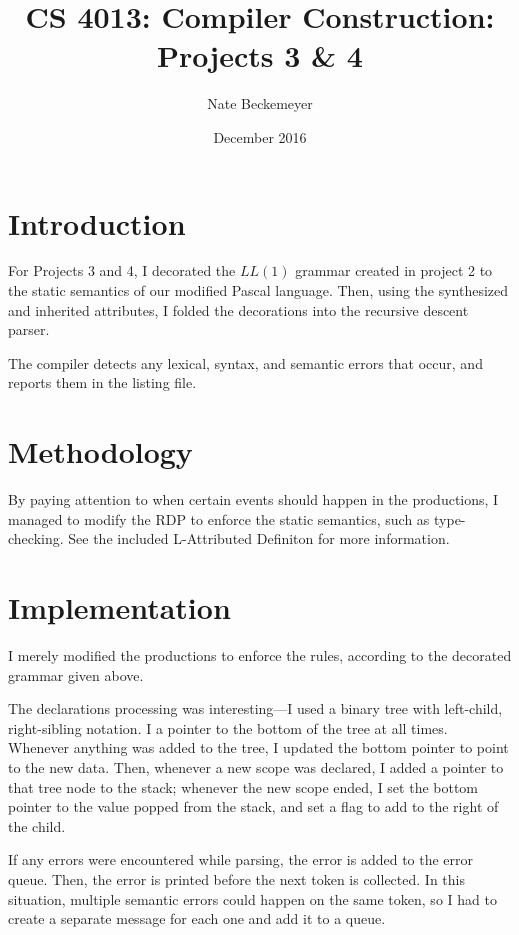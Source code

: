 \documentclass[titlepage]{article}
\author{Nate Beckemeyer}
\title{\textbf{CS 4013: Compiler Construction: Projects 3 \& 4}}
\date{December 2016}
\begin{document}
    \maketitle
    \section*{Introduction}
    For Projects 3 and 4, I decorated the $LL(1)$ grammar created in project
    2 to the static semantics of our modified Pascal language. Then,
    using the synthesized and inherited attributes, I folded the decorations
    into the recursive descent parser.

    The compiler detects any lexical, syntax, and semantic errors that occur,
    and reports them in the listing file.

    \section{Methodology}
    By paying attention to when certain events should happen in the productions,
    I managed to modify the RDP to enforce the static semantics, such as
    type-checking. See the included L-Attributed Definiton for more information.

    

    \section{Implementation}
    I merely modified the productions to enforce the rules, according to the
    decorated grammar given above.

    The declarations processing was interesting---I used a binary tree with
    left-child, right-sibling notation. I a pointer to the bottom of the
    tree at all times. Whenever anything was added to the tree, I updated
    the bottom pointer to point to the new data.
    Then, whenever a new scope was declared,
    I added a pointer to that tree node to the stack; whenever the new scope
    ended, I set the bottom pointer to the value popped from the stack, and
    set a flag to add to the right of the child.

    If any errors were encountered while parsing, the error is added
    to the error queue. Then, the error is printed before the next token
    is collected. In this situation, multiple semantic errors could happen
    on the same token, so I had to create a separate message for each one
    and add it to a queue.
\end{document}

